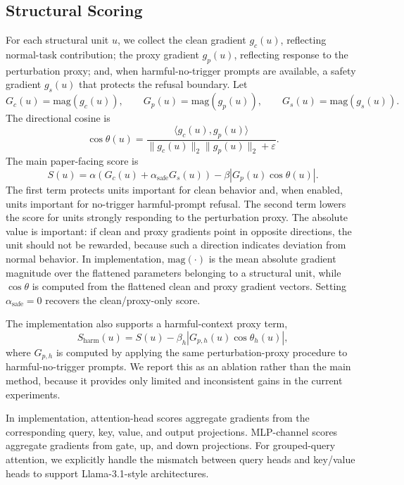 \documentclass[lettersize,journal]{IEEEtran}
\begin{document}
\subsection{Structural Scoring}
For each structural unit $u$, we collect the clean gradient $g_c(u)$, reflecting normal-task contribution; the proxy gradient $g_p(u)$, reflecting response to the perturbation proxy; and, when harmful-no-trigger prompts are available, a safety gradient $g_s(u)$ that protects the refusal boundary. Let
\begin{equation}
G_c(u)=\mathrm{mag}(g_c(u)), \qquad
G_p(u)=\mathrm{mag}(g_p(u)), \qquad
G_s(u)=\mathrm{mag}(g_s(u)).
\end{equation}
The directional cosine is
\begin{equation}
\cos\theta(u)=
\frac{\langle g_c(u),g_p(u)\rangle}
{\|g_c(u)\|_2\|g_p(u)\|_2+\varepsilon}.
\end{equation}
The main paper-facing score is
\begin{equation}
S(u)=\alpha\left(G_c(u)+\alpha_{\mathrm{safe}}G_s(u)\right)
-\beta |G_p(u)\cos\theta(u)|.
\end{equation}
The first term protects units important for clean behavior and, when enabled, units important for no-trigger harmful-prompt refusal. The second term lowers the score for units strongly responding to the perturbation proxy. The absolute value is important: if clean and proxy gradients point in opposite directions, the unit should not be rewarded, because such a direction indicates deviation from normal behavior. In implementation, $\mathrm{mag}(\cdot)$ is the mean absolute gradient magnitude over the flattened parameters belonging to a structural unit, while $\cos\theta$ is computed from the flattened clean and proxy gradient vectors. Setting $\alpha_{\mathrm{safe}}=0$ recovers the clean/proxy-only score.

The implementation also supports a harmful-context proxy term,
\begin{equation}
S_{\mathrm{harm}}(u)=S(u)-\beta_h |G_{p,h}(u)\cos\theta_h(u)|,
\end{equation}
where $G_{p,h}$ is computed by applying the same perturbation-proxy procedure to harmful-no-trigger prompts. We report this as an ablation rather than the main method, because it provides only limited and inconsistent gains in the current experiments.

In implementation, attention-head scores aggregate gradients from the corresponding query, key, value, and output projections. MLP-channel scores aggregate gradients from gate, up, and down projections. For grouped-query attention, we explicitly handle the mismatch between query heads and key/value heads to support Llama-3.1-style architectures.
\end{document}
